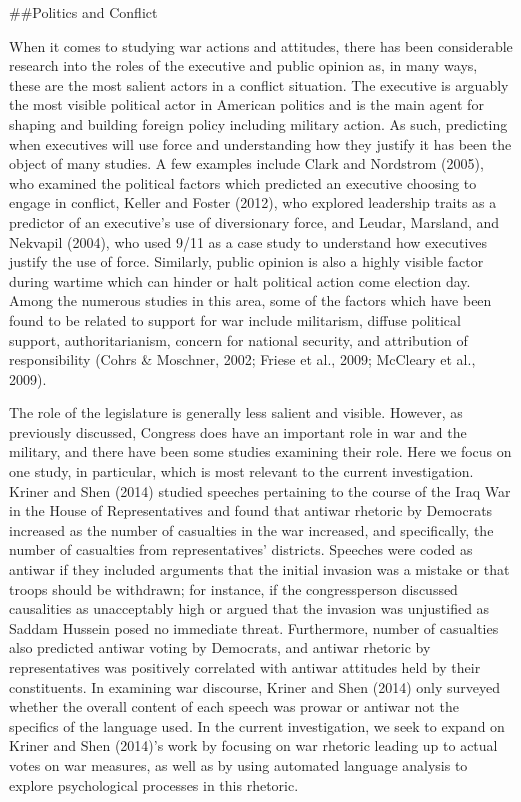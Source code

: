 \documentclass[english,,man]{apa6}
\theoremstyle{definition}
\theoremstyle{definition}
\theoremstyle{definition}
\theoremstyle{remark}
\begin{document}
\#\#Politics and Conflict

When it comes to studying war actions and attitudes, there has been
considerable research into the roles of the executive and public opinion
as, in many ways, these are the most salient actors in a conflict
situation. The executive is arguably the most visible political actor in
American politics and is the main agent for shaping and building foreign
policy including military action. As such, predicting when executives
will use force and understanding how they justify it has been the object
of many studies. A few examples include Clark and Nordstrom (2005), who
examined the political factors which predicted an executive choosing to
engage in conflict, Keller and Foster (2012), who explored leadership
traits as a predictor of an executive's use of diversionary force, and
Leudar, Marsland, and Nekvapil (2004), who used 9/11 as a case study to
understand how executives justify the use of force. Similarly, public
opinion is also a highly visible factor during wartime which can hinder
or halt political action come election day. Among the numerous studies
in this area, some of the factors which have been found to be related to
support for war include militarism, diffuse political support,
authoritarianism, concern for national security, and attribution of
responsibility (Cohrs \& Moschner, 2002; Friese et al., 2009; McCleary
et al., 2009).

The role of the legislature is generally less salient and visible.
However, as previously discussed, Congress does have an important role
in war and the military, and there have been some studies examining
their role. Here we focus on one study, in particular, which is most
relevant to the current investigation. Kriner and Shen (2014) studied
speeches pertaining to the course of the Iraq War in the House of
Representatives and found that antiwar rhetoric by Democrats increased
as the number of casualties in the war increased, and specifically, the
number of casualties from representatives' districts. Speeches were
coded as antiwar if they included arguments that the initial invasion
was a mistake or that troops should be withdrawn; for instance, if the
congressperson discussed causalities as unacceptably high or argued that
the invasion was unjustified as Saddam Hussein posed no immediate
threat. Furthermore, number of casualties also predicted antiwar voting
by Democrats, and antiwar rhetoric by representatives was positively
correlated with antiwar attitudes held by their constituents. In
examining war discourse, Kriner and Shen (2014) only surveyed whether
the overall content of each speech was prowar or antiwar not the
specifics of the language used. In the current investigation, we seek to
expand on Kriner and Shen (2014)'s work by focusing on war rhetoric
leading up to actual votes on war measures, as well as by using
automated language analysis to explore psychological processes in this
rhetoric.
\end{document}
